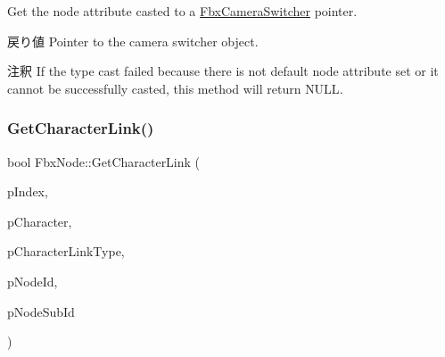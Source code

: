 Get the node attribute casted to a \hyperlink{class_fbx_camera_switcher}{Fbx\+Camera\+Switcher} pointer. \begin{DoxyReturn}{戻り値}
Pointer to the camera switcher object. 
\end{DoxyReturn}
\begin{DoxyRemark}{注釈}
If the type cast failed because there is not default node attribute set or it cannot be successfully casted, this method will return {\ttfamily N\+U\+LL}. 
\end{DoxyRemark}
\mbox{\label{class_fbx_node_a6e31c35d70b528f5bc0b553b6b0ff82d}} 
\subsubsection{\texorpdfstring{Get\+Character\+Link()}{GetCharacterLink()}}
{\footnotesize\ttfamily bool Fbx\+Node\+::\+Get\+Character\+Link (\begin{DoxyParamCaption}\item[{int}]{p\+Index,  }\item[{\hyperlink{class_fbx_character}{Fbx\+Character} $\ast$$\ast$}]{p\+Character,  }\item[{int $\ast$}]{p\+Character\+Link\+Type,  }\item[{int $\ast$}]{p\+Node\+Id,  }\item[{int $\ast$}]{p\+Node\+Sub\+Id }\end{DoxyParamCaption})}

